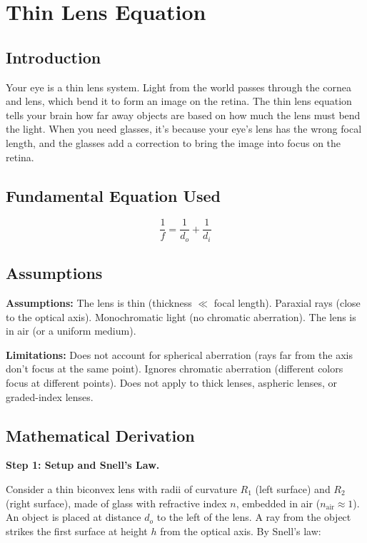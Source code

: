 \chapter{Thin Lens Equation}

\section*{Introduction}

Your eye is a thin lens system. Light from the world passes through the cornea and lens, which bend it to form an image on the retina. The thin lens equation tells your brain how far away objects are based on how much the lens must bend the light. When you need glasses, it's because your eye's lens has the wrong focal length, and the glasses add a correction to bring the image into focus on the retina.

\section*{Fundamental Equation Used}

\[
\frac{1}{f} = \frac{1}{d_o} + \frac{1}{d_i}
\]
\section*{Assumptions}

\textbf{Assumptions:} The lens is thin (thickness $\ll$ focal length). Paraxial rays (close to the optical axis). Monochromatic light (no chromatic aberration). The lens is in air (or a uniform medium).


\textbf{Limitations:} Does not account for spherical aberration (rays far from the axis don't focus at the same point). Ignores chromatic aberration (different colors focus at different points). Does not apply to thick lenses, aspheric lenses, or graded-index lenses.


\section*{Mathematical Derivation}

\textbf{Step 1: Setup and Snell's Law.}

Consider a thin biconvex lens with radii of curvature $R_1$ (left surface) and $R_2$ (right surface), made of glass with refractive index $n$, embedded in air ($n_{\text{air}} \approx 1$). An object is placed at distance $d_o$ to the left of the lens. A ray from the object strikes the first surface at height $h$ from the optical axis. By Snell's law:

